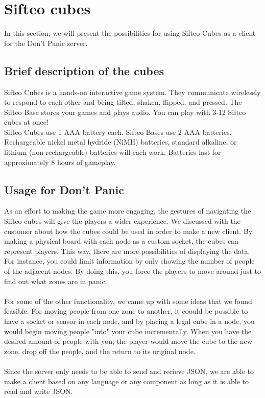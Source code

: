 \chapter{Sifteo cubes}

In this section, we will present the possibilities for using Sifteo Cubes as a client for the Don't Panic server.

\section{Brief description of the cubes}
Sifteo Cubes is a hands-on interactive game system. They communicate wirelessly to respond to each other and being tilted, shaken, flipped, and pressed. The Sifteo Base stores your games and plays audio. You can play with 3-12 Sifteo cubes at once!\\ 
Sifteo Cubes use 1 AAA battery each. Sifteo Bases use 2 AAA batteries. Rechargeable nickel metal hydride (NiMH) batteries, standard alkaline, or lithium (non-rechargeable) batteries will each work. Batteries last for approximately 8 hours of gameplay. ~\cite{website:Sifteo}


\section{Usage for Don't Panic}

As an effort to making the game more engaging, the gestures of navigating the Sifteo cubes will give the players a wider experience. We discussed with the customer about how the cubes could be used in order to make a new client. By making a physical board with each node as a custom socket, the cubes can represent players. This way, there are more possibilities of displaying the data. For instance, you could limit information by only showing the number of people of the adjacent nodes. By doing this, you force the players to move around just to find out what zones are in panic.\\
\\
For some of the other functionality, we came up with some ideas that we found feasible. For moving people from one zone to another, it coould be possible to have a socket or sensor in each node, and by placing a legal cube in a node, you would begin moving people "into" your cube incrementally. When you have the desired amount of people with you, the player would move the cube to the new zone, drop off the people, and the return to its original node.\\
\\
Since the server only needs to be able to send and recieve JSON, we are able to make a client based on any language or any component as long as it is able to read and write JSON. \\


